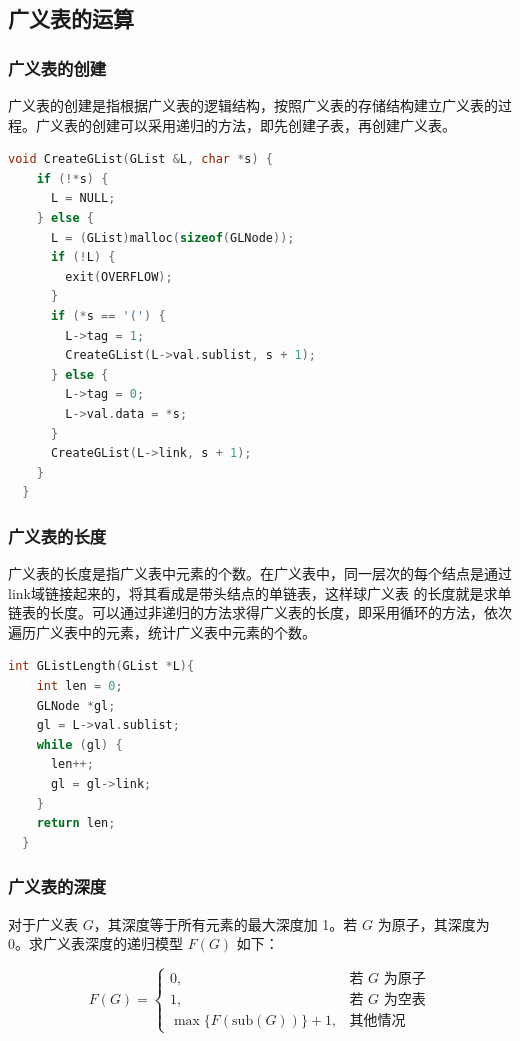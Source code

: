 \documentclass[lang=cn,newtx,10pt,scheme=chinese]{elegantbook}
\begin{document}
\subsection{广义表的运算}

\subsubsection{广义表的创建}

广义表的创建是指根据广义表的逻辑结构，按照广义表的存储结构建立广义表的过程。广义表的创建可以采用递归的方法，即先创建子表，再创建广义表。

\begin{lstlisting}[language=C++, caption={广义表的创建}]
  void CreateGList(GList &L, char *s) {
    if (!*s) {
      L = NULL;
    } else {
      L = (GList)malloc(sizeof(GLNode));
      if (!L) {
        exit(OVERFLOW);
      }
      if (*s == '(') {
        L->tag = 1;
        CreateGList(L->val.sublist, s + 1);
      } else {
        L->tag = 0;
        L->val.data = *s;
      }
      CreateGList(L->link, s + 1);
    }
  }
\end{lstlisting}

\subsubsection{广义表的长度}

广义表的长度是指广义表中元素的个数。在广义表中，同一层次的每个结点是通过link域链接起来的，将其看成是带头结点的单链表，这样球广义表
的长度就是求单链表的长度。可以通过非递归的方法求得广义表的长度，即采用循环的方法，依次遍历广义表中的元素，统计广义表中元素的个数。

\begin{lstlisting}[language=C++, caption={广义表的长度}]
  int GListLength(GList *L){
    int len = 0;
    GLNode *gl;
    gl = L->val.sublist;
    while (gl) {
      len++;
      gl = gl->link;
    }
    return len;
  }
\end{lstlisting}

\subsubsection{广义表的深度}

对于广义表 $G$，其深度等于所有元素的最大深度加 1。若 $G$ 为原子，其深度为 0。求广义表深度的递归模型 $F(G)$ 如下：

\[
F(G) =
\begin{cases} 
0, & \text{若 } G \text{ 为原子} \\ 
1, & \text{若 } G \text{ 为空表} \\ 
\max \{F(\text{sub}(G))\} + 1, & \text{其他情况}
\end{cases}
\]
\end{document}
